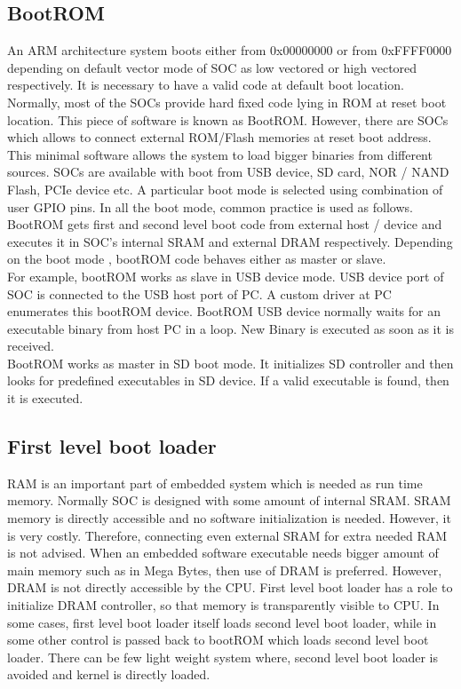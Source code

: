 \subsection {BootROM}
\indent An ARM architecture system boots either from 0x00000000 or from
0xFFFF0000 depending on default vector mode of SOC as low vectored or
high vectored respectively. It is necessary to have a valid code at
default boot location. Normally, most of the SOCs provide hard fixed
code lying in ROM at reset boot location. This piece of software is
known as BootROM. However, there are SOCs which allows to connect
external ROM/Flash memories at reset boot address. \\
\indent This minimal software allows the system to load bigger binaries
from different sources. SOCs are available with boot from USB device, SD
card, NOR / NAND Flash, PCIe device etc. A particular boot mode is
selected using combination of user GPIO pins. In all the boot mode,
common practice is used as follows. BootROM gets first and second level
boot code from external host / device and executes it in SOC's internal
SRAM and external DRAM respectively. Depending on the boot mode ,
bootROM code behaves either as master or slave.\\
\indent For example, bootROM works as slave in USB device mode. USB
device port of SOC is connected to the USB host port of PC. A custom
driver at PC enumerates this bootROM device. BootROM USB device normally
waits for an executable binary from host PC in a loop. New Binary is
executed as soon as it is received.\\
\indent BootROM works as master in SD boot mode. It initializes SD
controller and then looks for predefined executables in SD device. If
a valid executable is found, then it is executed.
\subsection {First level boot loader}
\indent RAM is an important part of embedded system which is needed as
run time memory. Normally SOC is designed with some amount of internal
SRAM. SRAM memory is directly accessible and no software initialization
is needed. However, it is very costly. Therefore, connecting even
external SRAM for extra needed RAM is not advised. When an embedded
software executable needs bigger amount of main memory such as in Mega
Bytes, then use of DRAM is preferred. However, DRAM is not directly
accessible by the CPU. First level boot loader has a role to
initialize DRAM controller, so that memory is transparently visible to
CPU. In some cases, first level boot loader itself loads second level
boot loader, while in some other control is passed back to bootROM which
loads second level boot loader. There can be few light weight system
where, second level boot loader is avoided and kernel is directly
loaded.
